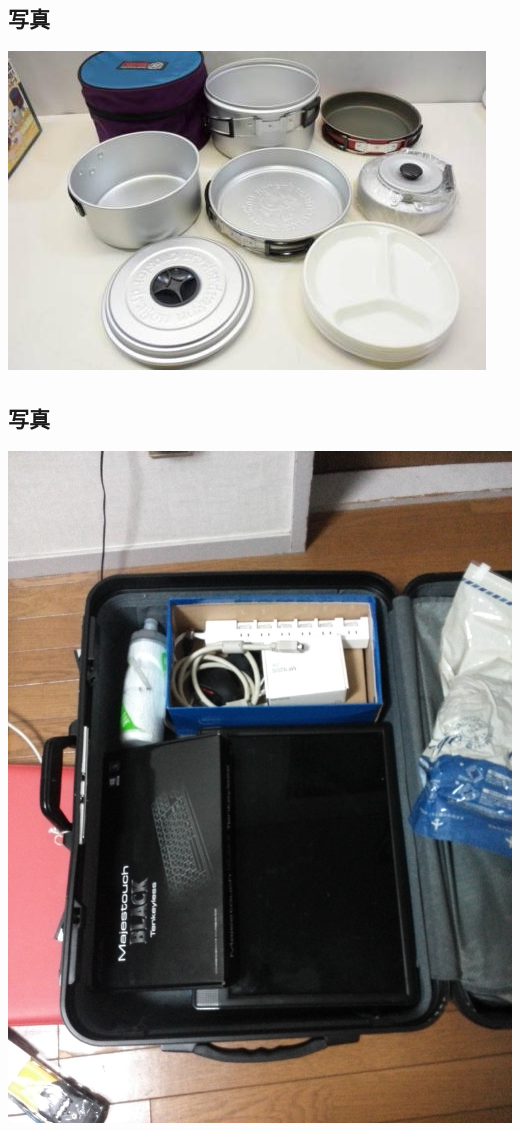\subsection{写真}
\label{sec-6-1}

\includegraphics{img/static/cooker.jpg}

\subsection{写真}
\label{sec-6-2}

\includegraphics{img/static/display.jpg}

